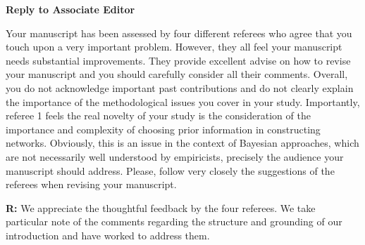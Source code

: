 \documentclass[12pt]{letter}
\newenvironment{refquote}{\bigskip \begin{it}}{\end{it}\smallskip}
\begin{document}
\newpage

\setcounter{page}{1}




{\Large \bf Reply to Associate Editor}


	\begin{refquote}
	Your manuscript has been assessed by four different referees who agree that you touch upon a very important problem. However, they all feel your manuscript needs substantial improvements. They provide excellent advise on how to revise your manuscript and you should carefully consider all their comments. Overall, you do not acknowledge important past contributions and do not clearly explain the importance of the methodological issues you cover in your study. Importantly, referee 1 feels the real novelty of your study is the consideration of the importance and complexity of choosing prior information in constructing networks. Obviously, this is an issue in the context of Bayesian approaches, which are not necessarily well understood by empiricists, precisely the audience your manuscript should address. Please, follow very closely the suggestions of the referees when revising your manuscript.

	\end{refquote}

	\textbf{R:} We appreciate the thoughtful feedback by the four referees. We take particular note of the comments regarding the structure and grounding of our introduction and have worked to address them. 
\end{document}

